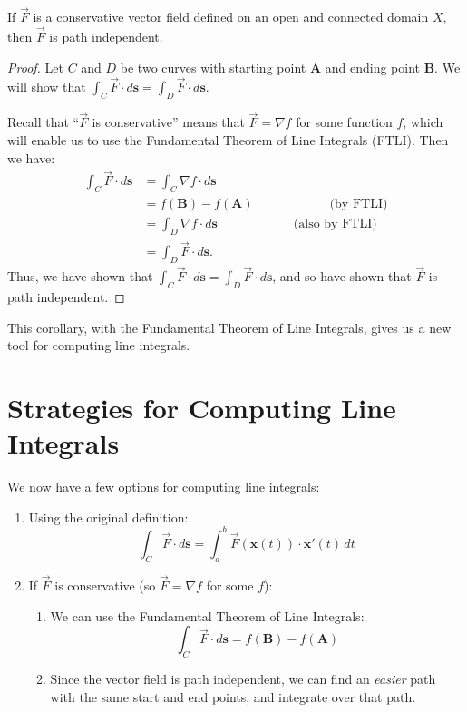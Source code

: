 \documentclass{ximera}
\begin{document}
\begin{corollary}
If $\vec{F}$ is a conservative vector field defined on an open and connected domain $X$, then $\vec{F}$ is path independent.
\end{corollary}

\begin{proof}
Let $C$ and $D$ be two curves with starting point $\textbf{A}$ and ending point $\textbf{B}$. We will show that $\int_C\vec{F}\cdot d\textbf{s}=\int_D\vec{F}\cdot d\textbf{s}$.

Recall that ``$\vec{F}$ is conservative'' means that $\vec{F}=\nabla f$ for some function $f$, which will enable us to use the Fundamental Theorem of Line Integrals (FTLI). Then we have:
\begin{align*}
\int_C\vec{F}\cdot d\textbf{s} &= \int_C\nabla f\cdot d\textbf{s}\\
&= f(\textbf{B})-f(\textbf{A})\hspace{1in}\textrm{(by FTLI)}\\
&= \int_D\nabla f\cdot d\textbf{s}\hspace{1in}\textrm{(also by FTLI)}\\
&= \int_D\vec{F}\cdot d\textbf{s}.
\end{align*}
Thus, we have shown that $\int_C\vec{F}\cdot d\textbf{s}=\int_D\vec{F}\cdot d\textbf{s}$, and so have shown that $\vec{F}$ is path independent.
\end{proof}

This corollary, with the Fundamental Theorem of Line Integrals, gives us a new tool for computing line integrals.

\section*{Strategies for Computing Line Integrals}

We now have a few options for computing line integrals:

\begin{enumerate}
\item Using the original definition:
\[
\int_C\vec{F}\cdot d\textbf{s} = \int_a^b\vec{F}(\textbf{x}(t))\cdot \textbf{x}'(t)\,dt
\]
\item If $\vec{F}$ is conservative (so $\vec{F}=\nabla f$ for some $f$):
\begin{enumerate}
\item We can use the Fundamental Theorem of Line Integrals: 
\[
\int_C\vec{F}\cdot d\textbf{s} = f(\textbf{B})-f(\textbf{A})
\]
\item Since the vector field is path independent, we can find an \emph{easier} path with the same start and end points, and integrate over that path.
\end{enumerate}
\end{enumerate}
\end{document}
